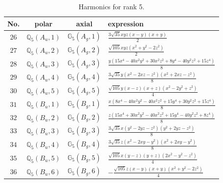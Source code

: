 \documentclass[fleqn,8pt,landscape]{jsarticle}
\begin{document}
\begin{table}[ht!]
\begin{center}
\caption{Harmonics for rank 5.}
\renewcommand{\arraystretch}{1.3}
\begin{tabular}{cccl} \hline \hline
No. & polar & axial & expression \\ \hline
$ 26 $ & $ \mathbb{Q}_{5}(A_{u},1) $ & $ \mathbb{G}_{5}(A_{g},1) $ & $ \frac{3 \sqrt{35} x y z \left(x - y\right) \left(x + y\right)}{2} $ \\
$ 27 $ & $ \mathbb{Q}_{5}(A_{u},2) $ & $ \mathbb{G}_{5}(A_{g},2) $ & $ \frac{\sqrt{105} x y z \left(x^{2} + y^{2} - 2 z^{2}\right)}{2} $ \\
$ 28 $ & $ \mathbb{Q}_{5}(A_{u},3) $ & $ \mathbb{G}_{5}(A_{g},3) $ & $ \frac{y \left(15 x^{4} - 40 x^{2} y^{2} + 30 x^{2} z^{2} + 8 y^{4} - 40 y^{2} z^{2} + 15 z^{4}\right)}{8} $ \\
$ 29 $ & $ \mathbb{Q}_{5}(A_{u},4) $ & $ \mathbb{G}_{5}(A_{g},4) $ & $ \frac{3 \sqrt{35} y \left(x^{2} - 2 x z - z^{2}\right) \left(x^{2} + 2 x z - z^{2}\right)}{8} $ \\
$ 30 $ & $ \mathbb{Q}_{5}(A_{u},5) $ & $ \mathbb{G}_{5}(A_{g},5) $ & $ \frac{\sqrt{105} y \left(x - z\right) \left(x + z\right) \left(x^{2} - 2 y^{2} + z^{2}\right)}{4} $ \\
$ 31 $ & $ \mathbb{Q}_{5}(B_{u},1) $ & $ \mathbb{G}_{5}(B_{g},1) $ & $ \frac{x \left(8 x^{4} - 40 x^{2} y^{2} - 40 x^{2} z^{2} + 15 y^{4} + 30 y^{2} z^{2} + 15 z^{4}\right)}{8} $ \\
$ 32 $ & $ \mathbb{Q}_{5}(B_{u},2) $ & $ \mathbb{G}_{5}(B_{g},2) $ & $ \frac{z \left(15 x^{4} + 30 x^{2} y^{2} - 40 x^{2} z^{2} + 15 y^{4} - 40 y^{2} z^{2} + 8 z^{4}\right)}{8} $ \\
$ 33 $ & $ \mathbb{Q}_{5}(B_{u},3) $ & $ \mathbb{G}_{5}(B_{g},3) $ & $ \frac{3 \sqrt{35} x \left(y^{2} - 2 y z - z^{2}\right) \left(y^{2} + 2 y z - z^{2}\right)}{8} $ \\
$ 34 $ & $ \mathbb{Q}_{5}(B_{u},4) $ & $ \mathbb{G}_{5}(B_{g},4) $ & $ \frac{3 \sqrt{35} z \left(x^{2} - 2 x y - y^{2}\right) \left(x^{2} + 2 x y - y^{2}\right)}{8} $ \\
$ 35 $ & $ \mathbb{Q}_{5}(B_{u},5) $ & $ \mathbb{G}_{5}(B_{g},5) $ & $ \frac{\sqrt{105} x \left(y - z\right) \left(y + z\right) \left(2 x^{2} - y^{2} - z^{2}\right)}{4} $ \\
$ 36 $ & $ \mathbb{Q}_{5}(B_{u},6) $ & $ \mathbb{G}_{5}(B_{g},6) $ & $ - \frac{\sqrt{105} z \left(x - y\right) \left(x + y\right) \left(x^{2} + y^{2} - 2 z^{2}\right)}{4} $ \\
 \hline \hline
\end{tabular}
\end{center}
\end{table}
\end{document}

